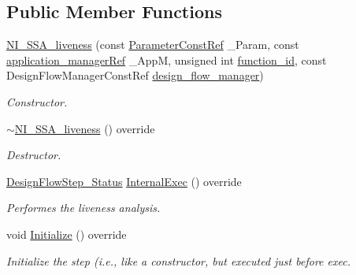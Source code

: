\subsection*{Public Member Functions}
\begin{DoxyCompactItemize}
\item 
\hyperlink{classNI__SSA__liveness_a96f6cf0c29fc5f8b666e715ab1a223b5}{N\+I\+\_\+\+S\+S\+A\+\_\+liveness} (const \hyperlink{Parameter_8hpp_a37841774a6fcb479b597fdf8955eb4ea}{Parameter\+Const\+Ref} \+\_\+\+Param, const \hyperlink{application__manager_8hpp_a04ccad4e5ee401e8934306672082c180}{application\+\_\+manager\+Ref} \+\_\+\+AppM, unsigned int \hyperlink{classFunctionFrontendFlowStep_a58ef2383ad1a212a8d3f396625a4b616}{function\+\_\+id}, const Design\+Flow\+Manager\+Const\+Ref \hyperlink{classDesignFlowStep_ab770677ddf087613add30024e16a5554}{design\+\_\+flow\+\_\+manager})
\begin{DoxyCompactList}\small\item\em Constructor. \end{DoxyCompactList}\item 
\hyperlink{classNI__SSA__liveness_acdaef526d16562e5df43797aad7aded0}{$\sim$\+N\+I\+\_\+\+S\+S\+A\+\_\+liveness} () override
\begin{DoxyCompactList}\small\item\em Destructor. \end{DoxyCompactList}\item 
\hyperlink{design__flow__step_8hpp_afb1f0d73069c26076b8d31dbc8ebecdf}{Design\+Flow\+Step\+\_\+\+Status} \hyperlink{classNI__SSA__liveness_aecf212baba3490d67930ead02c27dfc7}{Internal\+Exec} () override
\begin{DoxyCompactList}\small\item\em Performes the liveness analysis. \end{DoxyCompactList}\item 
void \hyperlink{classNI__SSA__liveness_acc878d0cb85006c946feebb6c43e474e}{Initialize} () override
\begin{DoxyCompactList}\small\item\em Initialize the step (i.\+e., like a constructor, but executed just before exec. \end{DoxyCompactList}\end{DoxyCompactItemize}
